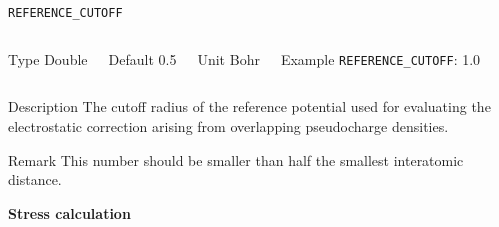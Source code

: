 \documentclass[xcolor=dvipsnames,t]{beamer}
\begin{document}
\begin{frame}[allowframebreaks]{\texttt{REFERENCE\_CUTOFF}} \label{REFERENCE_CUTOFF}
\vspace*{-12pt}
\begin{columns}
\begin{block}{Type}
Double
\end{block}

\begin{block}{Default}
0.5
\end{block}

\begin{block}{Unit}
Bohr
\end{block}

\begin{block}{Example}
\texttt{REFERENCE\_CUTOFF}: 1.0
\end{block}
\end{columns}

\begin{block}{Description}
The cutoff radius of the reference potential used for evaluating the electrostatic correction arising from overlapping pseudocharge densities.
\end{block}

\begin{block}{Remark}
This number should be smaller than half the smallest interatomic distance.
\end{block}

\end{frame}


\begin{frame}[allowframebreaks,c]{} \label{Stress calculation}

\begin{center}
\Huge \textbf{Stress calculation}
\end{center}

\end{frame}
\end{document}
